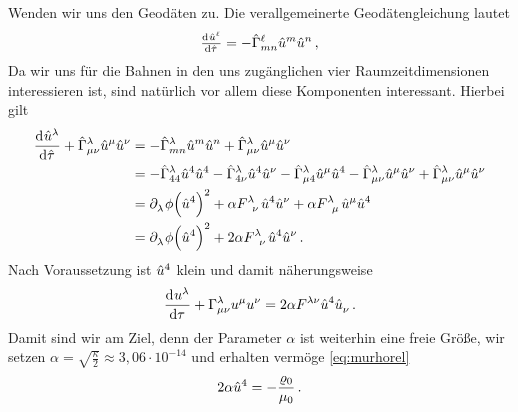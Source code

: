 Wenden wir uns den Geodäten zu. Die verallgemeinerte Geodätengleichung
lautet
\begin{equation}
\od{\tensor{\hat{u}}{^\ell}}{\hat{\tau}}=-\tensor*{\hat{\Gamma}}{^\ell_m_n}\tensor{\hat{u}}{^m}\tensor{\hat{u}}{^n}
\, ,
\end{equation}
Da wir uns für die Bahnen in den uns zugänglichen vier Raumzeitdimensionen
interessieren ist, sind natürlich vor allem diese Komponenten interessant.
Hierbei gilt
\begin{equation}
\begin{split}
\dod{\tensor{\hat{u}}{^\lambda}}{\hat{\tau}}
+\tensor*{\hat{\Gamma}}{^\lambda_\mu_\nu}\tensor{\hat{u}}{^\mu}\tensor{\hat{u}}{^\nu}
&=
-\tensor*{\hat{\Gamma}}{^\lambda_m_n}\tensor{\hat{u}}{^m}\tensor{\hat{u}}{^n}
+\tensor*{\hat{\Gamma}}{^\lambda_\mu_\nu}\tensor{\hat{u}}{^\mu}\tensor{\hat{u}}{^\nu}\\
&=
-\tensor*{\hat{\Gamma}}{^\lambda_4_4}\tensor{\hat{u}}{^4}\tensor{\hat{u}}{^4}
-\tensor*{\hat{\Gamma}}{^\lambda_4_\nu}\tensor{\hat{u}}{^4}\tensor{\hat{u}}{^\nu}
-\tensor*{\hat{\Gamma}}{^\lambda_\mu_4}\tensor{\hat{u}}{^\mu}\tensor{\hat{u}}{^4}
-\tensor*{\hat{\Gamma}}{^\lambda_\mu_\nu}\tensor{\hat{u}}{^\mu}\tensor{\hat{u}}{^\nu}
+\tensor*{\hat{\Gamma}}{^\lambda_\mu_\nu}\tensor{\hat{u}}{^\mu}\tensor{\hat{u}}{^\nu}
\\
&=
\tensor{\partial}{_\lambda}\phi\left(\tensor{\hat{u}}{^4}\right)^2
+\alpha\tensor{F}{^\lambda_\nu}\tensor{\hat{u}}{^4}\tensor{\hat{u}}{^\nu}
+\alpha\tensor{F}{^\lambda_\mu}\tensor{\hat{u}}{^\mu}\tensor{\hat{u}}{^4}\\
&=
\tensor{\partial}{_\lambda}\phi\left(\tensor{\hat{u}}{^4}\right)^2
+2\alpha\tensor{F}{^\lambda_\nu}\tensor{\hat{u}}{^4}\tensor{\hat{u}}{^\nu}\,.
\end{split}
\end{equation}
Nach Voraussetzung ist $\tensor{\hat{u}}{^4}$ klein und damit
näherungsweise
\begin{equation}
\dod{\tensor{u}{^\lambda}}{\tau}
+\tensor*{\Gamma}{^\lambda_\mu_\nu}\tensor{u}{^\mu}\tensor{u}{^\nu}
=2\alpha\tensor{F}{^\lambda^\nu}\tensor{\hat{u}}{^4}\tensor{\hat{u}}{_\nu}\,.
\label{eq:KaluzaGeo}
\end{equation}
Damit sind wir am Ziel, denn der Parameter $\alpha$ ist weiterhin eine
freie Größe, wir setzen 
 $\alpha=\sqrt{\frac{\kappa}{2}}\approx 3,06\cdot 10^{-14}$ und
erhalten vermöge \eqref{eq:murhorel}
\begin{equation}
2\alpha\tensor{\hat{u}}{^4}=-
\frac{\varrho_0}{\mu_0}\,.
\end{equation}
